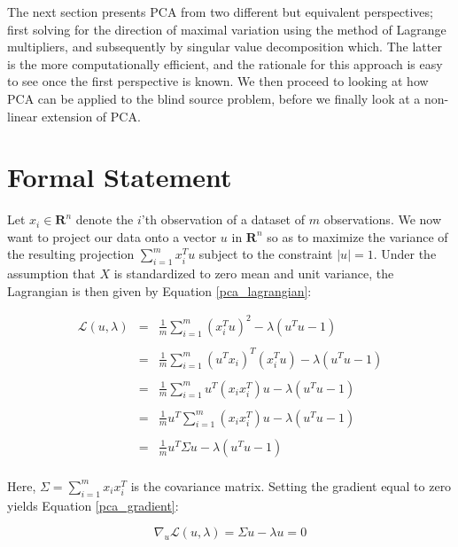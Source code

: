 \documentclass[11pt, oneside, a4paper]{report}
\begin{document}
The next section presents PCA from two different but equivalent
perspectives; first solving for the direction of maximal variation
using the method of Lagrange multipliers, and subsequently by singular
value decomposition which. The latter is the more computationally
efficient, and the rationale for this approach is easy to see once the
first perspective is known. We then proceed to looking at how PCA can
be applied to the blind source problem, before we finally look at a
non-linear extension of PCA.


\section{Formal Statement}

Let $x_i \in \mathbf{R}^n$ denote the $i$'th observation of a dataset
of $m$ observations. We now want to project our data onto a vector $u$
in $\mathbf{R}^n$ so as to maximize the variance of the resulting
projection $\sum_{i=1}^m x_i^Tu$ subject to the constraint
$|u|=1$. Under the assumption that $X$ is standardized to zero mean
and unit variance, the Lagrangian is then given by Equation \ref{pca_lagrangian}:

  \begin{equation}
    \label{pca_lagrangian}
    \begin{array}{lcl}
      \mathcal{L}(u,\lambda) & = & \frac{1}{m} \sum_{i=1}^m (x_i^Tu)^2 - \lambda (u^Tu -1) \\
      \\& = & \frac{1}{m} \sum_{i=1}^m (u^Tx_i)^T(x_i^Tu) - \lambda (u^Tu -1) \\
      \\& = & \frac{1}{m} \sum_{i=1}^m u^T(x_ix_i^T)u - \lambda (u^Tu -1) \\
      \\& = & \frac{1}{m}  u^T\sum_{i=1}^m(x_ix_i^T)u - \lambda (u^Tu -1) \\
      \\& = & \frac{1}{m} u^T\Sigma u - \lambda (u^Tu -1) \\
    \end{array}
  \end{equation}

Here, $\Sigma = \sum_{i = 1}^m x_ix_i^T$ is the covariance matrix. Setting the gradient equal to zero yields Equation \ref{pca_gradient}:

\begin{equation}
  \label{pca_gradient}
  \nabla_u \mathcal{L}(u, \lambda) = \Sigma u - \lambda u = 0
\end{equation}
\end{document}
